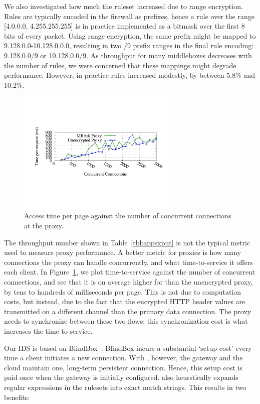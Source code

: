 We also investigated how much the ruleset increased due to range encryption. Rules are typically encoded in the firewall as prefixes, hence a rule over the range [4.0.0.0, 4.255.255.255] is in practice implemented as a bitmask over the first 8 bits of every packet.
Using range encryption, the same prefix might be mapped to 9.128.0.0-10.128.0.0.0, resulting in two /9 prefix ranges in the final rule encoding: 9.128.0.0/9 or 10.128.0.0/9.
As throughput for many middleboxes decreases with the number of rules, we were concerned that these mappings might degrade performance. However, in practice rules increased modestly, by between 5.8\% and 10.2\%.

\begin{figure}[t]
\centering
\includegraphics[width=3in]{fig/proxytime}
\caption{\label{fig:proxygraph} Access time per page against the number of concurrent connections at the proxy.}
\end{figure}

 The throughput number shown in Table~\ref{tbl:appsxput} is not the typical metric used to measure proxy performance. A better metric for proxies is how many connections the proxy can handle concurrently, and what time-to-service it offers each client. In Figure~\ref{fig:proxygraph}, we plot time-to-service against the number of concurrent connections, and see that it is on average higher for \sys than the unencrypted proxy, by tens to hundreds of milliseconds per page.
This is not due to computation costs, but instead, due to the fact that the encrypted HTTP header values are transmitted on a different channel than the primary data connection.
The \sys proxy needs to synchronize between these two flows; this synchronization cost is what increases the time to service. 


Our IDS is based on BlindBox~\cite{blindbox}. BlindBox incurs a substantial `setup cost' every time a client initiates a new connection. With \sys, however, the gateway and the cloud maintain one, long-term persistent connection. 
Hence, this setup cost is paid once when the gateway is initially configured. \sys also heurstically expands regular expressions in the rulesets into exact match strings. This results in two benefits:

